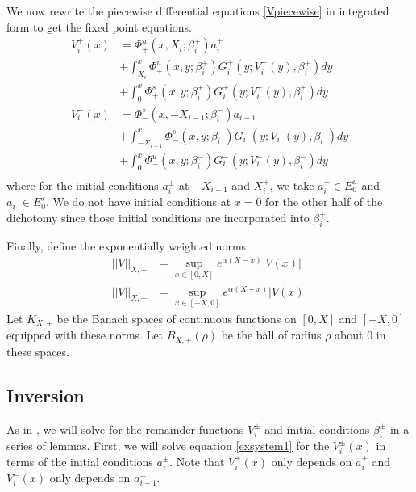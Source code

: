 \documentclass[thesis.tex]{subfiles}
\begin{document}
We now rewrite the piecewise differential equations \eqref{Vpiecewise} in integrated form to get the fixed point equations.
\begin{equation}\label{FPequations}
\begin{aligned}
V_i^+(x) &= \Phi^u_+(x, X_i; \beta_i^+) a_i^+  \\
&+ \int_{X_i}^x \Phi_+^u(x, y; \beta_i^+) G_i^+(y; V_i^+(y),\beta_i^+)dy \\
&+ \int_0^x \Phi_+^s(x, y; \beta_i^+) G_i^+(y; V_i^+(y),\beta_i^+)dy \\ 
V_i^-(x) &= \Phi^s_-(x, -X_{i-1}; \beta_i^-) a_{i-1}^-  \\
&+ \int_{-X_{i-1}}^x \Phi_-^s(x, y; \beta_i^-) G_i^-(y; V_i^-(y),\beta_i^-)dy \\
&+ \int_0^x \Phi_-^u(x, y; \beta_i^-) G_i^-(y; V_i^-(y),\beta_i^-)dy \\
\end{aligned}
\end{equation}
where for the initial conditions $a_i^\pm$ at $-X_{i-1}$ and $X_i^+$, we take $a_i^+ \in E_0^u$ and $a_i^- \in E_0^s$. We do not have initial conditions at $x = 0$ for the other half of the dichotomy since those initial conditions are incorporated into $\beta_i^\pm$.

Finally, define the exponentially weighted norms
\begin{equation}\label{expwtnorm}
\begin{aligned}
||V||_{X, +} &= \sup_{x \in [0, X]} e^{\alpha(X - x)}|V(x)| \\
||V||_{X, -} &= \sup_{x \in [-X, 0]} e^{\alpha(X + x)}|V(x)|
\end{aligned}
\end{equation}
Let $K_{X, \pm}$ be the Banach spaces of continuous functions on $[0, X]$ and $[-X, 0]$ equipped with these norms. Let $B_{X, \pm}(\rho)$ be the ball of radius $\rho$ about $0$ in these spaces.

\subsection{Inversion}

As in \cite{SandstedeStrut}, we will solve for the remainder functions $V_i^\pm$ and initial conditions $\beta_i^\pm$ in a series of lemmas. First, we will solve equation \cref{exsystem1} for the $V_i^\pm(x)$ in terms of the initial conditions $a_i^\pm$. Note that $V_i^+(x)$ only depends on $a_i^+$ and $V_i^-(x)$ only depends on $a_{i-1}^-$.
\end{document}
